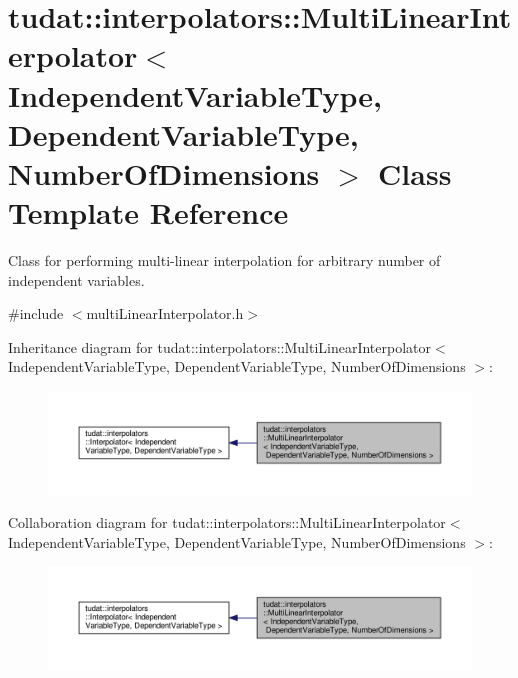 \hypertarget{classtudat_1_1interpolators_1_1MultiLinearInterpolator}{}\section{tudat\+:\+:interpolators\+:\+:Multi\+Linear\+Interpolator$<$ Independent\+Variable\+Type, Dependent\+Variable\+Type, Number\+Of\+Dimensions $>$ Class Template Reference}
\label{classtudat_1_1interpolators_1_1MultiLinearInterpolator}


Class for performing multi-\/linear interpolation for arbitrary number of independent variables.  




{\ttfamily \#include $<$multi\+Linear\+Interpolator.\+h$>$}



Inheritance diagram for tudat\+:\+:interpolators\+:\+:Multi\+Linear\+Interpolator$<$ Independent\+Variable\+Type, Dependent\+Variable\+Type, Number\+Of\+Dimensions $>$\+:
\nopagebreak
\begin{figure}[H]
\begin{center}
\leavevmode
\includegraphics[width=350pt]{classtudat_1_1interpolators_1_1MultiLinearInterpolator__inherit__graph}
\end{center}
\end{figure}


Collaboration diagram for tudat\+:\+:interpolators\+:\+:Multi\+Linear\+Interpolator$<$ Independent\+Variable\+Type, Dependent\+Variable\+Type, Number\+Of\+Dimensions $>$\+:
\nopagebreak
\begin{figure}[H]
\begin{center}
\leavevmode
\includegraphics[width=350pt]{classtudat_1_1interpolators_1_1MultiLinearInterpolator__coll__graph}
\end{center}
\end{figure}
